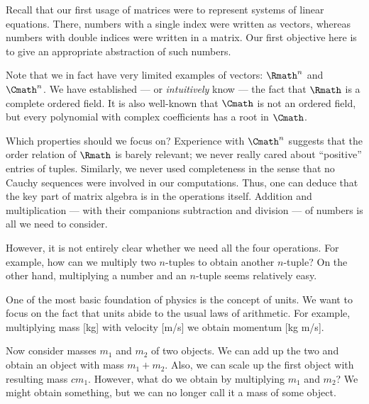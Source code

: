 \label{sec:vectorspace}

Recall that our first usage of matrices
were to represent systems of linear equations.
There, numbers with a single index were written as vectors,
whereas numbers with double indices were written in a matrix.
Our first objective here
is to give an appropriate abstraction of such numbers.

\begin{example}
    \label{exm:vspintro}
    Note that we in fact have very limited examples of vectors:
    \(\Rmath^n\) and \(\Cmath^n\).
    We have established
    --- or \emph{intuitively} know ---
    the fact that \(\Rmath\) is a complete ordered field.
    It is also well-known that
    \(\Cmath\) is not an ordered field,
    but every polynomial with complex coefficients
    has a root in \(\Cmath\).

    Which properties should we focus on?
    Experience with \(\Cmath^n\) suggests that
    the order relation of \(\Rmath\) is barely relevant;
    we never really cared about ``positive'' entries of tuples.
    Similarly, we never used completeness in the sense that
    no Cauchy sequences were involved in our computations.
    Thus, one can deduce that
    the key part of matrix algebra is in the operations itself.
    Addition and multiplication
    --- with their companions subtraction and division ---
    of numbers is all we need to consider.

    However, it is not entirely clear whether
    we need all the four operations.
    For example, how can we multiply two \(n\)-tuples
    to obtain another \(n\)-tuple?
    On the other hand,
    multiplying a number and an \(n\)-tuple seems relatively easy.
\end{example}

\begin{example}
    \label{exm:vspintro2}
    One of the most basic foundation of physics is the concept of units.
    We want to focus on the fact that
    units abide to the usual laws of arithmetic.
    For example, multiplying mass [kg] with velocity [m/s]
    we obtain momentum [kg m/s].

    Now consider masses \(m_1\) and \(m_2\) of two objects.
    We can add up the two and obtain an object with mass \(m_1+m_2\).
    Also, we can scale up the first object with resulting mass \(cm_1\).
    However, what do we obtain by multiplying \(m_1\) and \(m_2\)?
    We might obtain something,
    but we can no longer call it a mass of some object.
\end{example}

